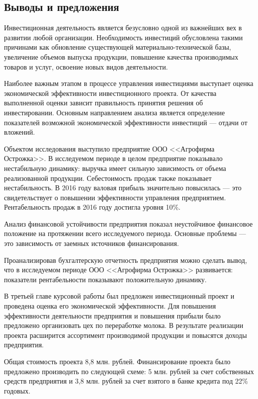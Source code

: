 \subsection*{Выводы и предложения}

Инвестиционная деятельность является безусловно одной из важнейших вех в развитии любой организации. Необходимость инвестиций обусловлена такими причинами как обновление существующей материально-технической базы, увеличение объемов выпуска продукции, повышение качества производимых товаров и услуг, освоение новых видов деятельности.

Наиболее важным этапом в процессе управления инвестициями выступает оценка экономической эффективности инвестиционного проекта. От качества выполненной оценки зависит правильность принятия решения об инвестировании. Основным направлением анализа является определение показателей возможной экономической эффективности инвестиций --- отдачи от вложений.

Объектом исследования выступило предприятие ООО <<Агрофирма Острожка>>. В исследуемом периоде в целом предприятие показывало нестабильную динамику: выручка имеет сильную зависимость от объема реализованной продукции. Себестоимость продаж также показывает нестабильность. В 2016 году валовая прибыль значительно повысилась --- это свидетельствует о повышении эффективности управления предприятием. Рентабельность продаж в 2016 году достигла уровня 10\%.

Анализ финансовой устойчивости предприятия показал неустойчивое финансовое положение на протяжении всего исследуемого периода. Основные проблемы --- это зависимость от заемных источников финансирования.

Проанализировав бухгалтерскую отчетность предприятия можно сделать вывод, что в исследуемом периоде ООО <<Агрофирма Острожка>> развивается: показатели рентабельности показывают положительную динамику.

В третьей главе курсовой работы был предложен инвестиционный проект и проведена оценка его экономической эффективности. Для повышения эффективности деятельности предприятия и повышения прибыли было предложено организовать цех по переработке молока. В результате реализации проекта расширится ассортимент производимой продукции и повысятся доходы предприятия.

Общая стоимость проекта 8,8 млн. рублей. Финансирование проекта было предложено производить по следующей схеме: 5 млн. рублей за счет собственных средств предприятия и 3,8 млн. рублей за счет взятого в банке кредита под 22\% годовых.

